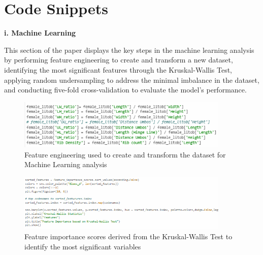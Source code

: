 %
%
%                 

\chapter{Code Snippets}
\label{sec:appendixa}



%

\noindent\textbf{i. Machine Learning}
\vspace{-0.5cm}

This section of the paper displays the key steps in the machine learning analysis by performing feature engineering to create and transform a new dataset, identifying the most significant features through the Kruskal-Wallis Test, applying random undersampling to address the minimal imbalance in the dataset, and conducting five-fold cross-validation to evaluate the model's performance.


\begin{figure}[!htbp]
	\centering
	\includegraphics[width=0.9\textwidth, angle=0]{figures/feature_engineering.png}
	\caption{Feature engineering used to create and transform the dataset for Machine Learning analysis}
\end{figure}

\begin{figure}[!htbp]
	\centering
	\includegraphics[width=0.9\textwidth, angle=0]{figures/feature_importance.png}
	\caption{Feature importance scores derived from the Kruskal-Wallis Test to identify the most significant variables}
\end{figure}

